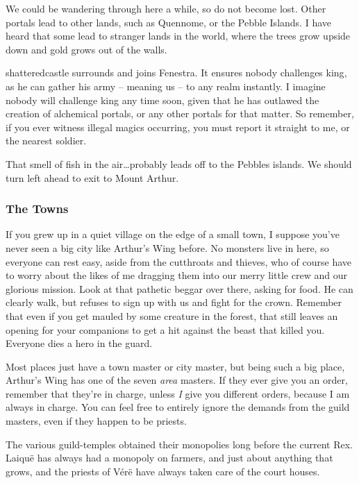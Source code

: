 \begin{multicols}{2}
\begin{exampletext}
  We could be wandering through here a while, so do not become lost.
  Other portals lead to other lands, such as Quennome, or the Pebble Islands.
  I have heard that some lead to stranger lands in the world, where the trees grow upside down and gold grows out of the walls.

  \Gls{shatteredcastle} surrounds and joins Fenestra.
  It ensures nobody challenges \gls{king}, as he can gather his army -- meaning us -- to any realm instantly.
  I imagine nobody will challenge \gls{king} any time soon, given that he has outlawed the creation of alchemical portals, or any other portals for that matter.
  So remember, if you ever witness illegal magics occurring, you must report it straight to me, or the nearest soldier.

  That smell of fish in the air\ldots probably leads off to the Pebbles islands.
  We should turn left ahead to exit to Mount Arthur.

\end{exampletext}

\subsubsection{The Towns}

\begin{exampletext}

  If you grew up in a quiet village on the edge of a small town, I suppose you've never seen a big city like Arthur's Wing before.
  No monsters live in here, so everyone can rest easy, aside from the cutthroats and thieves, who of course have to worry about the likes of me dragging them into our merry little crew and our glorious mission.
  Look at that pathetic beggar over there, asking for food.
  He can clearly walk, but refuses to sign up with us and fight for the crown.
  Remember that even if you get mauled by some creature in the forest, that still leaves an opening for your companions to get a hit against the beast that killed you.
  Everyone dies a hero in the \gls{guard}.

  Most places just have a town master or city master, but being such a big place, Arthur's Wing has one of the seven \textit{area} masters.
  If they ever give you an order, remember that they're in charge, unless \emph{I} give you different orders, because I am always in charge.
  You can feel free to entirely ignore the demands from the guild masters, even if they happen to be priests.

  The various guild-temples obtained their monopolies long before the current Rex.
  Laiqu\"e has always had a monopoly on farmers, and just about anything that grows, and the priests of V\'er\"e have always taken care of the court houses.


\end{exampletext}
\end{multicols}
